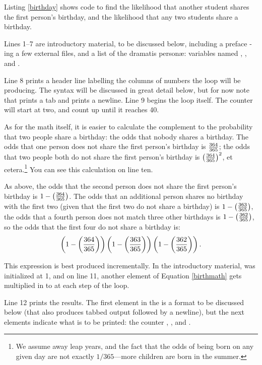 Listing \ref{birthday} shows code to find the likelihood that another
student shares the first person's birthday, and the likelihood that any
two students share a birthday. 

Lines 1--7 are introductory material, to be discussed below, including a
preface -ing a few external files, and a list of the
dramatis person\ae: variables named , ,
and .

Line 8 prints a header line labelling the columns of numbers the
 loop will be producing. The syntax will be discussed in great
detail below, but for now note that  prints a tab and
 prints a newline. Line 9 begins the  loop
itself. The counter  will start at two, and count up until it reaches 40.

As for the math itself, it is easier to calculate the complement to
the probability that two people share a birthday: the odds that nobody
shares a birthday. The odds that one person does not share the first
person's birthday is ${364\over 365}$; the odds that two people both do
not share the first person's birthday is $\left(364\over 365\right)^2$,
et cetera.\footnote{We assume away leap years, and the fact that the odds
of being born on any given day are not exactly $1/365$---more children
are born in the summer.} You can see this calculation on line ten.

As above, the odds that the second person does not share the first
person's birthday is $1 - \left(364\over 365\right)$. The odds that an
additional person shares no birthday with the first two (given that the
first two do not share a birthday) is $1 - \left(363\over 365\right)$,
the odds that a fourth person does not match three other birthdays is $1 - \left(362\over 365\right)$,
so the odds that the first four do not share a birthday is:
\begin{equation}
\left(1 - \left(364\over 365\right)\right)\left(1 - \left(363\over 365\right)\right)\left(1 - \left(362\over 365\right)\right).
\label{birthmath}
\end{equation}

This expression is best produced incrementally. In the introductory
material,  was initialized at 1, and on line 11, 
another element of Equation \ref{birthmath} gets
multiplied in to  
at each step of the  loop.

Line 12 prints the results. The first element in the  is a
format to be discussed below (that also produces tabbed
output followed by a newline), but the next elements indicate what is to be
printed: the counter , , and .

